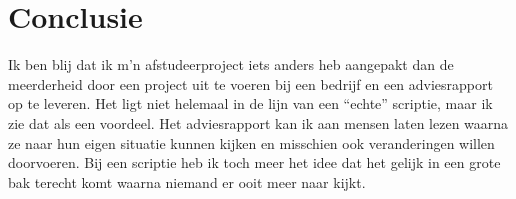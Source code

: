 \chapter{Conclusie}

Ik ben blij dat ik m'n afstudeerproject iets anders heb aangepakt dan de meerderheid door een project uit te voeren bij een bedrijf en een adviesrapport op te leveren. Het ligt niet helemaal in de lijn van een ``echte'' scriptie, maar ik zie dat als een voordeel. Het adviesrapport kan ik aan mensen laten lezen waarna ze naar hun eigen situatie kunnen kijken en misschien ook veranderingen willen doorvoeren. Bij een scriptie heb ik toch meer het idee dat het gelijk in een grote bak terecht komt waarna niemand er ooit meer naar kijkt.

